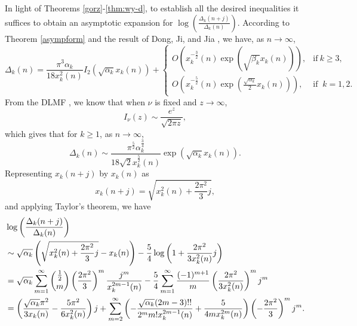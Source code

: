 \documentclass[12pt]{article}
\numberwithin{equation}{section}
\begin{document}
In light of Theorems \ref{gorz}-\ref{thm:wy-d}, to establish all the desired inequalities it suffices to obtain an asymptotic expansion for $\log\left(\frac{\Delta_k(n+j)}{\Delta_k(n)}\right)$.
According to Theorem \ref{asympform} and the result of Dong, Ji, and Jia \cite[Theorem 1.2]{Dong-Ji-Jia-2023}, we have, as $n\rightarrow \infty$,
\begin{equation*}
\Delta_k(n)=\frac{ \pi^3\alpha_k}{18 {x^2_{k}(n)}} I_2\left(\sqrt{\alpha_k } {x_{k}(n)}\right)+
\begin{cases}
O\left(x_{k}^{-\frac{3}{2}}(n)
\exp\left(\sqrt{\beta_k}x_{k}(n) \right)\right),& \text{if}~k\geq3,
\\[6pt]
O\left(x_{k}^{-\frac{5}{2}}(n)
\exp\left(\frac{\sqrt{\alpha_k}}2x_{k}(n) \right)\right),& \text{if }~k=1,2.
\end{cases}
\end{equation*}
From the DLMF \cite[(10.30.4)]{Olver-Lozier-Boisvert-Clark-2010}, we know that when $\nu$ is fixed and $z\rightarrow \infty$,
\begin{equation*}
  I_{\nu}(z)\sim \frac{e^z}{\sqrt{2\pi z}},
\end{equation*}
which gives that for $k\geq 1$, as $n\rightarrow \infty$,
\begin{equation*}
\Delta_k(n)\sim\frac{ \pi^{\frac{5}{2}}\alpha_k^{\frac{3}{4}}}{18\sqrt{2} {x^{\frac{5}{2}}_{k}(n)}} \exp\left(\sqrt{\alpha_k } {x_{k}(n)}\right).
\end{equation*}
Representing $x_{k}(n+j)$ by $x_{k}(n)$ as
\begin{equation*}
 x_{k}(n+j)=\sqrt{x_{k}^2(n)+\frac{2\pi^2}{3}j},
\end{equation*}
and applying Taylor's theorem, we have
\begin{align}\label{asym:log-delta}
&\log\left(\frac{\Delta_k(n+j)}{\Delta_k(n)}\right)
\notag\\
&\sim \sqrt{\alpha_k }\left(\sqrt{x_{k}^2(n)+\frac{2\pi^2}{3}j}
-x_{k}(n)\right)-\frac{5}{4}\log\left(1+\frac{2\pi^2}{3x_{k}^2(n)}j\right)
\notag\\
&=\sqrt{\alpha_k }\sum_{m=1}^\infty{\frac{1}{2} \choose m}\left(\frac{2\pi^2}{3}\right)^m\frac{j^m}{x_{k}^{2m-1}(n)}
-\frac{5}{4}\sum_{m=1}^\infty\frac{(-1)^{m+1}}{m}
\left(\frac{2\pi^2}{3x_{k}^2(n)}\right)^mj^m
\notag\\
&=\left(\frac{\sqrt{\alpha_k }\pi^2}{3x_{k}(n)}-\frac{5\pi^2}{6x_{k}^2(n)}\right)j+
\sum_{m=2}^\infty\left(-\frac{\sqrt{\alpha_k }(2m-3)!!}{2^m m!x_{k}^{2m-1}(n)}+\frac{5}{4mx_{k}^{2m}(n)}\right)
\left(-\frac{2\pi^2}{3}\right)^m j^m.
\end{align}
\end{document}
